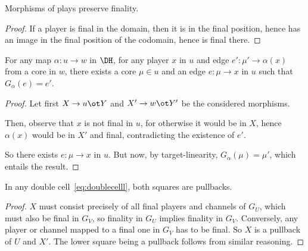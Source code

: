 \documentclass{LMCS}
\theoremstyle{plain}\newtheorem{satz}[thm]{Satz}
\begin{document}
\begin{lem}\label{lem:presfinal}
  Morphisms of plays preserve finality.
\end{lem}
\begin{proof}
  If a player is final in the domain, then it is in the final
  position, hence has an image in the final position of the codomain,
  hence is final there.
\end{proof}

\begin{lem}\label{lem:mapfib}
  For any map $\alpha \colon u \to w$ in $\DH$, for any player $x$ in
  $u$ and edge $e' \colon \mu' \to \alpha (x)$ from a core in $w$,
  there exists a core $\mu \in u$ and an edge $e \colon \mu \to x$ in
  $u$ such that $G_\alpha (e) = e'$.
\end{lem}
\begin{proof}
  Let first $X \to u \ot Y$ and $X' \to w \ot Y'$ be the considered
  morphisms.

  Then, observe that $x$ is not final in $u$, for otherwise it would
  be in $X$, hence $\alpha (x)$ would be in $X'$ and final,
  contradicting the existence of $e'$.

  So there exists $e \colon \mu \to x$ in $u$. But now, by
  target-linearity, $G_\alpha(\mu) = \mu'$, which entails the result.
\end{proof}

\begin{lem}\label{lem:morpbk}
  In any double cell~\eqref{eq:doublecelll}, both squares are pullbacks.
\end{lem}
\begin{proof}
  $X$ must consist precisely of all final players and channels of
  $G_U$, which must also be final in $G_V$, so finality in $G_U$
  implies finality in $G_V$. Conversely, any player or channel mapped
  to a final one in $G_V$ has to be final. So $X$ is a pullback of $U$
  and $X'$.  The lower square being a pullback follows from similar
  reasoning.
\end{proof}
\end{document}
